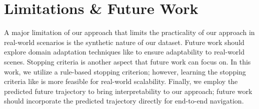 \documentclass[11pt]{article}
\begin{document}
\section{Limitations \& Future Work}

A major limitation of our approach that limits the practicality of our approach in real-world scenarios is the synthetic nature of our dataset. Future work should explore domain adaptation techniques like \cite{kundu2021generalize, kang2020pixel} to ensure adaptability to real-world scenes. Stopping criteria is another aspect that future work can focus on. In this work, we utilize a rule-based stopping criterion; however, learning the stopping criteria like \cite{xiang-etal-2020-learning} is more feasible for real-world scalability. Finally, we employ the predicted future trajectory to bring interpretability to our approach; future work should incorporate the predicted trajectory directly for end-to-end navigation.








\end{document}
